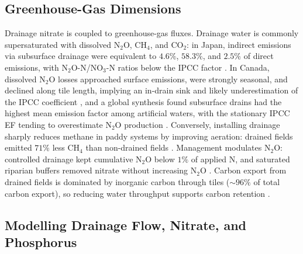 \subsection{Greenhouse-Gas Dimensions}

Drainage nitrate is coupled to greenhouse-gas fluxes. Drainage water is
commonly supersaturated with dissolved N$_2$O, CH$_4$, and CO$_2$: in Japan,
indirect emissions via subsurface drainage were equivalent to $4.6\%$,
$58.3\%$, and $2.5\%$ of direct emissions, with N$_2$O-N/NO$_3$-N ratios below
the IPCC factor \parencite{Sawamoto2003,Minamikawa2010,Minamikawa2013}. In
Canada, dissolved N$_2$O losses approached surface emissions, were strongly
seasonal, and declined along tile length, implying an in-drain sink and likely
underestimation of the IPCC coefficient \parencite{Burton2024}, and a global
synthesis found subsurface drains had the highest mean emission factor among
artificial waters, with the stationary IPCC EF tending to overestimate N$_2$O
production \parencite{Webb2021}. Conversely, installing drainage sharply
reduces methane in paddy systems by improving aeration: drained fields emitted
$71\%$ less CH$_4$ than non-drained fields \parencite{Shiratori2007,Furukawa2008}.
Management modulates N$_2$O: controlled drainage kept cumulative N$_2$O below
$1\%$ of applied N, and saturated riparian buffers removed nitrate without
increasing N$_2$O \parencite{Smith2019,Davis2019,Nash2015e,Carstensen2021}.
Carbon export from drained fields is dominated by inorganic carbon through
tiles ($\sim96\%$ of total carbon export), so reducing water throughput
supports carbon retention \parencite{Schilling2023,Driscoll2025}.

\subsection{Modelling Drainage Flow, Nitrate, and Phosphorus}

